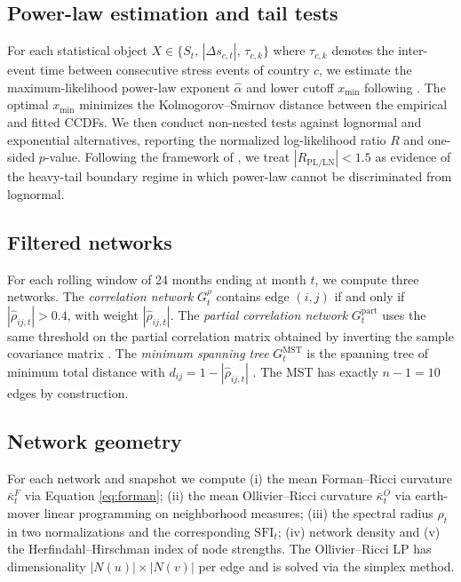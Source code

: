 \documentclass[12pt,a4paper]{article}
\begin{document}
\subsection{Power-law estimation and tail tests}
For each statistical object $X\in\{S_t,\,|\Delta s_{c,t}|,\,\tau_{c,k}\}$ where
$\tau_{c,k}$ denotes the inter-event time between consecutive stress events
of country $c$, we estimate the maximum-likelihood power-law exponent
$\hat{\alpha}$ and lower cutoff $x_{\min}$ following \citet{Clauset2009}. The
optimal $x_{\min}$ minimizes the Kolmogorov--Smirnov distance between the
empirical and fitted CCDFs. We then conduct \citet{Vuong1989} non-nested tests
against lognormal and exponential alternatives, reporting the normalized
log-likelihood ratio $R$ and one-sided $p$-value. Following the framework of
\citet{StumpfPorter2012}, we treat $|R_{\mathrm{PL/LN}}|<1.5$ as evidence of
the heavy-tail boundary regime in which power-law cannot be discriminated
from lognormal.

\subsection{Filtered networks}
For each rolling window of 24 months ending at month $t$, we compute three
networks. The \emph{correlation network} $G_t^{\rho}$ contains edge $(i,j)$
if and only if $|\hat{\rho}_{ij,t}|>0.4$, with weight $|\hat{\rho}_{ij,t}|$.
The \emph{partial correlation network} $G_t^{\mathrm{part}}$ uses the same
threshold on the partial correlation matrix obtained by inverting the
sample covariance matrix \citep{Mantegna1999}. The
\emph{minimum spanning tree} $G_t^{\mathrm{MST}}$ is the spanning tree of
minimum total distance with $d_{ij}=1-|\hat{\rho}_{ij,t}|$
\citep{Tumminello2005}. The MST has exactly $n-1=10$ edges by construction.

\subsection{Network geometry}
For each network and snapshot we compute (i) the mean Forman--Ricci curvature
$\bar{\kappa}_t^F$ via Equation \eqref{eq:forman}; (ii) the mean
Ollivier--Ricci curvature $\bar{\kappa}_t^O$ via earth-mover linear
programming on neighborhood measures; (iii) the spectral radius $\rho_t$ in
two normalizations and the corresponding $\mathrm{SFI}_t$; (iv) network
density and (v) the Herfindahl--Hirschman index of node strengths. The
Ollivier--Ricci LP has dimensionality $|N(u)|\times|N(v)|$ per edge and is
solved via the simplex method.
\end{document}
